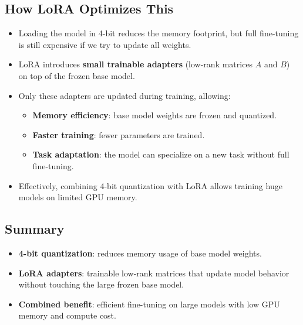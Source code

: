 \documentclass[a4paper, 12pt]{article}
\begin{document}
\subsection*{How LoRA Optimizes This}

\begin{itemize}
    \item Loading the model in 4-bit reduces the memory footprint, but full fine-tuning is still expensive if we try to update all weights.
    \item LoRA introduces \textbf{small trainable adapters} (low-rank matrices $A$ and $B$) on top of the frozen base model.
    \item Only these adapters are updated during training, allowing:
    \begin{itemize}
        \item \textbf{Memory efficiency}: base model weights are frozen and quantized.
        \item \textbf{Faster training}: fewer parameters are trained.
        \item \textbf{Task adaptation}: the model can specialize on a new task without full fine-tuning.
    \end{itemize}
    \item Effectively, combining 4-bit quantization with LoRA allows training huge models on limited GPU memory.
\end{itemize}

\subsection*{Summary}

\begin{tcolorbox}[colback=blue!5!white,colframe=blue!75!black,title=Takeaway]
\begin{itemize}
    \item \textbf{4-bit quantization}: reduces memory usage of base model weights.
    \item \textbf{LoRA adapters}: trainable low-rank matrices that update model behavior without touching the large frozen base model.
    \item \textbf{Combined benefit}: efficient fine-tuning on large models with low GPU memory and compute cost.
\end{itemize}
\end{tcolorbox}

\newpage
\end{document}
